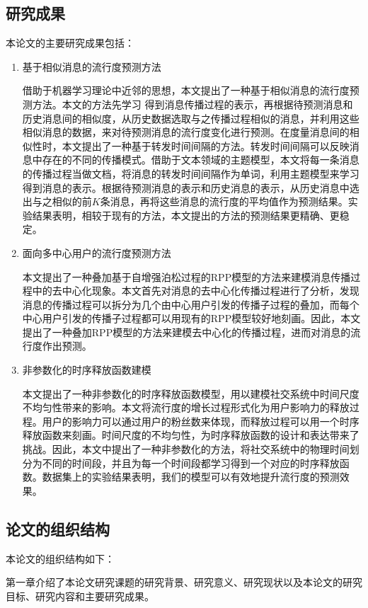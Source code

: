 \subsection{研究成果}
本论文的主要研究成果包括：
\begin{enumerate}
\item 基于相似消息的流行度预测方法

借助于机器学习理论中近邻的思想，本文提出了一种基于相似消息的流行度预测方法。本文的方法先学习 得到消息传播过程的表示，再根据待预测消息和历史消息间的相似度，从历史数据选取与之传播过程相似的消息，并利用这些相似消息的数据，来对待预测消息的流行度变化进行预测。在度量消息间的相似性时，本文提出了一种基于转发时间间隔的方法。转发时间间隔可以反映消息中存在的不同的传播模式。借助于文本领域的主题模型，本文将每一条消息的传播过程当做文档，将消息的转发时间间隔作为单词，利用主题模型来学习得到消息的表示。根据待预测消息的表示和历史消息的表示，从历史消息中选出与之相似的前$K$条消息，再将这些消息的流行度的平均值作为预测结果。实验结果表明，相较于现有的方法，本文提出的方法的预测结果更精确、更稳定。
\item 面向多中心用户的流行度预测方法

本文提出了一种叠加基于自增强泊松过程的RPP模型\citep{shen2014modeling}的方法来建模消息传播过程中的去中心化现象。本文首先对消息的去中心化传播过程进行了分析，发现消息的传播过程可以拆分为几个由中心用户引发的传播子过程的叠加，而每个中心用户引发的传播子过程都可以用现有的RPP模型较好地刻画。因此，本文提出了一种叠加RPP模型的方法来建模去中心化的传播过程，进而对消息的流行度作出预测。
\item 非参数化的时序释放函数建模

本文提出了一种非参数化的时序释放函数模型，用以建模社交系统中时间尺度不均匀性带来的影响。本文将流行度的增长过程形式化为用户影响力的释放过程。用户的影响力可以通过用户的粉丝数来体现，而释放过程可以用一个时序释放函数来刻画。时间尺度的不均匀性，为时序释放函数的设计和表达带来了挑战。因此，本文中提出了一种非参数化的方法，将社交系统中的物理时间划分为不同的时间段，并且为每一个时间段都学习得到一个对应的时序释放函数。数据集上的实验结果表明，我们的模型可以有效地提升流行度的预测效果。
\end{enumerate}
\subsection{论文的组织结构}
本论文的组织结构如下：

第一章介绍了本论文研究课题的研究背景、研究意义、研究现状以及本论文的研究目标、研究内容和主要研究成果。

